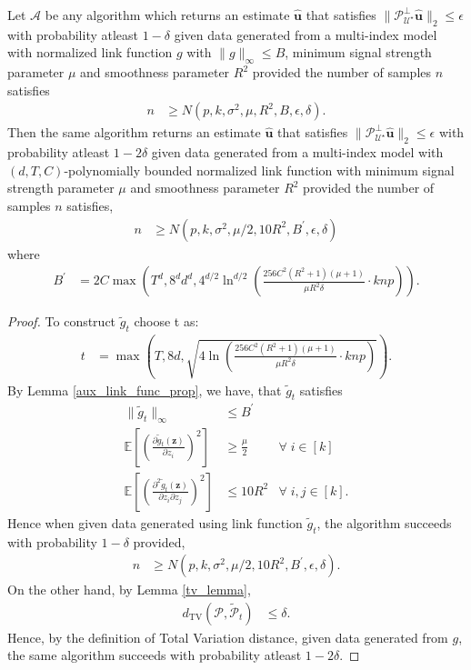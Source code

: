 \documentclass[final,12pt]{colt2018} %
\newcommand{\E}{\mathbb{E}}
\renewcommand\v[1]{{\ensuremath{\boldsymbol{#1}}}}
\begin{document}
\begin{theorem} Let $\mathcal{A}$ be any algorithm which returns an estimate $\hat{\v u}$ that satisfies $\|\mathcal{P}^\perp_{\mathcal{U}^\star} \hat{\v u}\|_2 \leq \epsilon$ with probability atleast $1-\delta$ given data generated from a multi-index model with normalized link function $g$ with $\|g\|_\infty \leq B$, minimum signal strength parameter $\mu$ and smoothness parameter $R^2$ provided the number of samples $n$ satisfies
\begin{align*}
    n &\geq N(p,k,\sigma^2,\mu,R^2, B, \epsilon, \delta).
\end{align*}
Then the same algorithm returns an estimate $\hat{\v u}$ that satisfies $\|\mathcal{P}^\perp_{\mathcal{U}^\star} \hat{\v u}\|_2 \leq \epsilon$ with probability atleast $1-2\delta$ given data generated from a multi-index model with $(d,T,C)$-polynomially bounded normalized link function with minimum signal strength parameter $\mu$ and smoothness parameter $R^2$ provided the number of samples $n$ satisfies,
\begin{align*}
    n & \geq N(p,k,\sigma^2,\mu/2, 10R^2,B^\prime ,\epsilon,\delta)
\end{align*}
where
\begin{align*}
    B^\prime & = 2C \max \left( T^d, 8^d d^d, 4^{d/2} \ln^{d/2} \left( \frac{256C^2(R^2+1)(\mu+1)}{\mu R^2 \delta} \cdot knp \right) \right).
\end{align*}
\end{theorem}
\begin{proof}
To construct $\tilde{g}_t$ choose t as: 
\begin{align*}
    t & = \max \left( T, 8d, \sqrt{4 \ln \left(  \frac{256C^2(R^2+1)(\mu+1)}{\mu R^2 \delta} \cdot knp \right)} \right).
\end{align*}
By Lemma \ref{aux_link_func_prop}, we have, that $\tilde{g}_t$ satisfies
\begin{align*}
    \| \tilde{g}_t \|_\infty & \leq B^\prime \\
    \E\left[\left( \frac{\partial \tilde{g}_t(\v z)}{\partial z_i}\right)^2\right] &\geq \frac{\mu}{2} & \forall \; i \in [k] \\
    \E \left[ \left(\frac{\partial^2 \tilde{g}_t(\v z)}{\partial z_i \partial z_j}\right)^2 \right] &\leq 10R^2 & \forall \; i,j \in [k].
\end{align*}
Hence when given data generated using link function $\tilde{g}_t$, the algorithm succeeds with probability $1-\delta$ provided,
\begin{align*}
    n & \geq N(p,k,\sigma^2,\mu/2, 10R^2,B^\prime ,\epsilon,\delta).
\end{align*}
On the other hand, by Lemma \ref{tv_lemma}, 
\begin{align*}
    d_{\text{TV}} (\mathcal{P}, \mathcal{\tilde{P}}_t) & \leq \delta.
\end{align*}
Hence, by the definition of Total Variation distance, given data generated from $g$, the same algorithm succeeds with probability atleast $1-2\delta$.
\end{proof}
\end{document}
